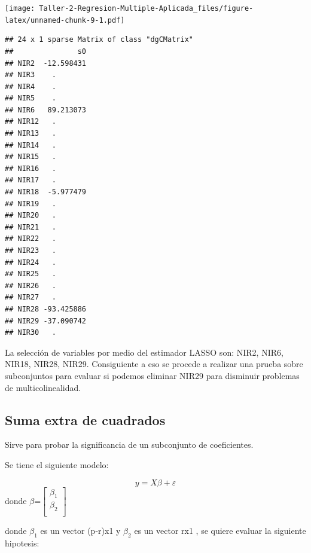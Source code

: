 \documentclass[
]{article}
\newenvironment{Shaded}{\begin{snugshade}}{\end{snugshade}}
\newcommand{\AttributeTok}[1]{\textcolor[rgb]{0.77,0.63,0.00}{#1}}
\newcommand{\DecValTok}[1]{\textcolor[rgb]{0.00,0.00,0.81}{#1}}
\newcommand{\FloatTok}[1]{\textcolor[rgb]{0.00,0.00,0.81}{#1}}
\newcommand{\FunctionTok}[1]{\textcolor[rgb]{0.00,0.00,0.00}{#1}}
\newcommand{\NormalTok}[1]{#1}
\newcommand{\OtherTok}[1]{\textcolor[rgb]{0.56,0.35,0.01}{#1}}
\newcommand{\SpecialCharTok}[1]{\textcolor[rgb]{0.00,0.00,0.00}{#1}}
\begin{document}
\texttt{[image: Taller-2-Regresion-Multiple-Aplicada\_files/figure-latex/unnamed-chunk-9-1.pdf]}

\begin{Shaded}
\end{Shaded}

\begin{verbatim}
## 24 x 1 sparse Matrix of class "dgCMatrix"
##               s0
## NIR2  -12.598431
## NIR3    .       
## NIR4    .       
## NIR5    .       
## NIR6   89.213073
## NIR12   .       
## NIR13   .       
## NIR14   .       
## NIR15   .       
## NIR16   .       
## NIR17   .       
## NIR18  -5.977479
## NIR19   .       
## NIR20   .       
## NIR21   .       
## NIR22   .       
## NIR23   .       
## NIR24   .       
## NIR25   .       
## NIR26   .       
## NIR27   .       
## NIR28 -93.425886
## NIR29 -37.090742
## NIR30   .
\end{verbatim}

La selección de variables por medio del estimador LASSO son: NIR2, NIR6,
NIR18, NIR28, NIR29. Consiguiente a eso se procede a realizar una prueba
sobre subconjuntos para evaluar si podemos eliminar NIR29 para disminuir
problemas de multicolinealidad.

\hypertarget{suma-extra-de-cuadrados}{%
\subsection{Suma extra de cuadrados}\label{suma-extra-de-cuadrados}}

Sirve para probar la significancia de un subconjunto de coeficientes.

Se tiene el siguiente modelo:

\[y = X\beta+\varepsilon\] donde
\(\beta\)=\(\begin{bmatrix} \beta_{1}\\ \beta_{2} \\ \end{bmatrix}\)

donde \(\beta_1\) es un vector (p-r)x1 y \(\beta_2\) es un vector rx1 ,
se quiere evaluar la siguiente hipotesis:
\end{document}
